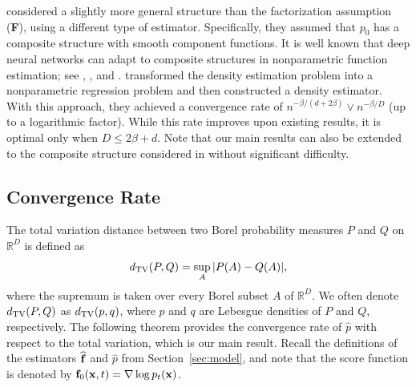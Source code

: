 \documentclass[twoside,11pt]{article}
\newcommand{\bff}{{\bf f}}
\newcommand{\bF}{{\bf F}}
\newcommand{\bx}{{\bf x}}
\newcommand{\bbR}{{\mathbb R}}
\newcommand{\bean}{\setlength\arraycolsep{1pt}\begin{eqnarray*}}
\newcommand{\eean}{\end{eqnarray*}}
\begin{document}
\citet{bos2024supervised} considered a slightly more general structure than the factorization assumption (\bF), using a different type of estimator. Specifically, they assumed that $p_0$ has a composite structure with smooth component functions. It is well known that deep neural networks can adapt to composite structures in nonparametric function estimation; see \citet{schmidt2020nonparametric}, \citet{bauer2019deep}, and \citet{kohler2021rate}. \citet{bos2024supervised} transformed the density estimation problem into a nonparametric regression problem and then constructed a density estimator. With this approach, they achieved a convergence rate of $n^{-\beta/(d+2\beta)} \vee n^{-\beta/D}$ (up to a logarithmic factor). While this rate improves upon existing results, it is optimal only when $D \leq 2\beta + d$. Note that our main results can also be extended to the composite structure considered in \citet{bos2024supervised} without significant difficulty. 


\subsection{Convergence Rate}
\label{sec:conv}

The total variation distance between two Borel probability measures $P$ and $Q$ on $\bbR^{D}$ is defined as
\bean
d_{\rm TV}(P,Q) = \sup_{A} \vert P(A) - Q(A) \vert,
\eean
where the supremum is taken over every Borel subset $A$ of $\bbR^{D}$.
We often denote $d_{\rm TV}(P,Q)$ as $d_{\rm TV}(p,q)$, where $p$ and $q$ are Lebesgue densities of $P$ and $Q$, respectively.
The following theorem provides the convergence rate of $\widehat p$ with respect to the total variation, which is our main result.
Recall the definitions of the estimators $\widehat{\bff}$ and $\widehat{p}$ from Section~\ref{sec:model}, and note that the score function is denoted by $\bff_0(\bx, t) = \nabla \log p_t(\bx)$.
\end{document}
